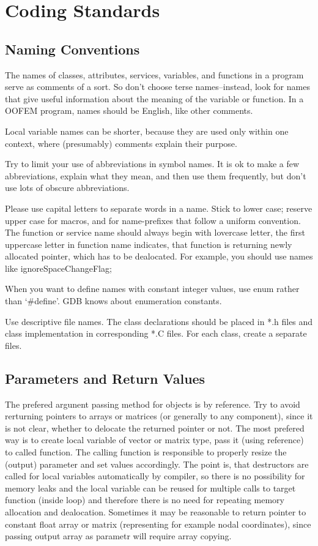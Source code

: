 \documentclass[12pt,draft]{article}
\begin{document}
\section{Coding Standards}
\subsection{Naming Conventions}

The names of classes, attributes, services, variables, and functions
in a program serve as comments of a sort. So don't choose terse names--instead, look for names that give useful information about the meaning of the variable or function. In a OOFEM
program, names should be English, like other comments. 

Local variable names can be shorter, because they are used only within one context, where (presumably) comments explain
their purpose. 

Try to limit your use of abbreviations in symbol names. It is ok to make a few abbreviations, explain what they mean, and
then use them frequently, but don't use lots of obscure abbreviations. 

Please use capital letters to separate words in a name. Stick to
lower case; reserve upper case for macros, and for name-prefixes that
follow a uniform convention. The function or service name should always begin with lovercase
letter, the first uppercase letter in function name indicates, that
function is returning newly allocated pointer, which has to be dealocated.
For example, you should use names like ignoreSpaceChangeFlag; 

When you want to define names with constant integer values, use enum rather than `\#define'. GDB knows about
enumeration constants. 

Use descriptive file names. The class declarations should be placed in *.h files
and class implementation in corresponding *.C files. For each class, create a separate files.


\subsection{Parameters and Return Values}

The prefered argunent passing method for objects is by reference. 
Try to avoid rerturning pointers to arrays or matrices (or generally
to any component), since it is not clear, whether to delocate the
returned pointer or not. The most prefered way is to create local
variable of vector or matrix type, pass it (using reference) to called
function. The calling function is responsible to properly resize the
(output) parameter and set values accordingly. The point is, that
destructors are called for local variables automatically by compiler,
so there is no possibility for memory leaks and the local variable can
be reused for multiple calls to target function (inside loop) and
therefore there is no need for repeating memory allocation and
dealocation. Sometimes it may be reasonable to return pointer to
constant float array or matrix (representing for example
nodal coordinates), since passing output array as parametr will require 
array copying. 
\end{document}
